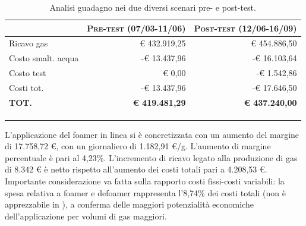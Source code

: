 \begin{table}[htbp]
\centering
\footnotesize
\caption{Analisi guadagno nei due diversi scenari pre- e post-test.}
\label{tab:guadagno}
\begin{tabular}{lrr}
\cline{2-3}
\multicolumn{1}{l|}{}                    & \multicolumn{1}{l|}{\textsc{Pre-test (07/03-11/06)}}              & \multicolumn{1}{l|}{\textsc{Post-test (12/06-16/09)}}             \\ \hline
\multicolumn{1}{|l|}{Ricavo gas}         & \multicolumn{1}{r|}{€ 432.919,25}                        & \multicolumn{1}{r|}{€ 454.886,50}                        \\
\multicolumn{1}{|l|}{Costo smalt. acqua} & \multicolumn{1}{r|}{{\color[HTML]{CB0000} -€ 13.437,96}} & \multicolumn{1}{r|}{{\color[HTML]{CB0000} -€ 16.103,64}} \\
\multicolumn{1}{|l|}{Costo test}         & \multicolumn{1}{r|}{€ 0,00}                              & \multicolumn{1}{r|}{-€ 1.542,86}                         \\
\multicolumn{1}{|l|}{Costi tot.}         & \multicolumn{1}{r|}{{\color[HTML]{CB0000} -€ 13.437,96}} & \multicolumn{1}{r|}{{\color[HTML]{CB0000} -€ 17.646,50}} \\
\multicolumn{1}{|l|}{\textbf{TOT.}}      & \multicolumn{1}{r|}{\textbf{€ 419.481,29}}               & \multicolumn{1}{r|}{\textbf{€ 437.240,00}}               \\ \hline
\textbf{}                                & \multicolumn{1}{l}{}                                     & \multicolumn{1}{l}{}                                     \\
\textbf{}                                & \multicolumn{1}{l}{\textbf{}}                            & \multicolumn{1}{l}{}                                     \\
\textbf{}                                & \multicolumn{1}{l}{\textbf{}}                            & \multicolumn{1}{l}{}                                    
\end{tabular}
\end{table}

L'applicazione del foamer in linea si è concretizzata con un aumento del margine di 17.758,72 €, con un giornaliero di 1.182,91 €/g. L'aumento di margine percentuale è pari al 4,23\%. L'incremento di ricavo legato alla produzione di gas di 8.342 € è netto rispetto all'aumento dei costi totali pari a 4.208,53 €. Importante considerazione va fatta sulla rapporto costi fissi-costi variabili: la spesa relativa a foamer e defoamer rappresenta l'8,74\% dei costi totali (non è apprezzabile in ), a conferma delle maggiori potenzialità economiche dell'applicazione per volumi di gas maggiori.\\

